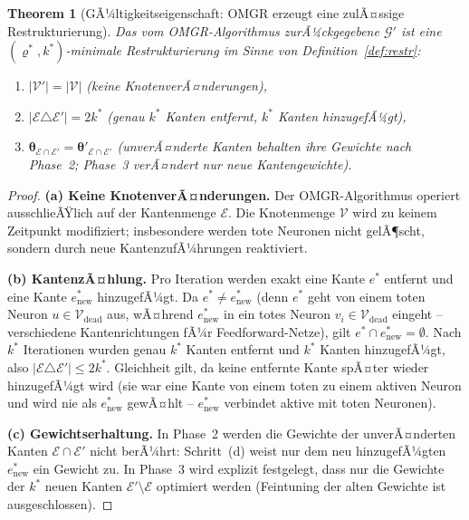 ﻿\documentclass[12pt, a4paper, openany]{report}
\newtheorem{theorem}{Theorem}[chapter]
\newcommand{\calG}{\mathcal{G}}
\newcommand{\calV}{\mathcal{V}}
\newcommand{\calE}{\mathcal{E}}
\begin{document}
\begin{theorem}[GÃ¼ltigkeitseigenschaft: OMGR erzeugt eine zulÃ¤ssige Restrukturierung]
\label{thm:omgr_validity}
Das vom OMGR-Algorithmus zurÃ¼ckgegebene $\calG'$ ist eine
$(\varrho^*, k^*)$-minimale Restrukturierung im Sinne von
Definition~\ref{def:restr}:
\begin{enumerate}[label=(\alph*)]
  \item $|\calV'| = |\calV|$ \quad (keine KnotenverÃ¤nderungen),
  \item $|\calE \triangle \calE'| = 2k^*$ \quad (genau $k^*$ Kanten
        entfernt, $k^*$ Kanten hinzugefÃ¼gt),
  \item $\bm{\theta}_{\calE \cap \calE'} = \bm{\theta}'_{\calE \cap \calE'}$
        \quad (unverÃ¤nderte Kanten behalten ihre Gewichte nach Phase~2;
        Phase~3 verÃ¤ndert nur neue Kantengewichte).
\end{enumerate}
\end{theorem}

\begin{proof}
\textbf{(a) Keine KnotenverÃ¤nderungen.}
Der OMGR-Algorithmus operiert ausschlieÃŸlich auf der Kantenmenge $\calE$.
Die Knotenmenge $\calV$ wird zu keinem Zeitpunkt modifiziert; insbesondere
werden tote Neuronen nicht gelÃ¶scht, sondern durch neue KantenzufÃ¼hrungen
reaktiviert.

\textbf{(b) KantenzÃ¤hlung.}
Pro Iteration werden exakt eine Kante $e^*$ entfernt und eine Kante
$e_{\mathrm{new}}^*$ hinzugefÃ¼gt.  Da $e^* \neq e_{\mathrm{new}}^*$
(denn $e^*$ geht von einem toten Neuron $u \in \calV_{\mathrm{dead}}$ aus,
wÃ¤hrend $e_{\mathrm{new}}^*$ in ein totes Neuron $v_i \in \calV_{\mathrm{dead}}$
eingeht -- verschiedene Kantenrichtungen fÃ¼r Feedforward-Netze), gilt
$e^* \cap e_{\mathrm{new}}^* = \emptyset$.
Nach $k^*$ Iterationen wurden genau $k^*$ Kanten entfernt und $k^*$
Kanten hinzugefÃ¼gt, also $|\calE \triangle \calE'| \leq 2k^*$.
Gleichheit gilt, da keine entfernte Kante spÃ¤ter wieder hinzugefÃ¼gt wird
(sie war eine Kante von einem toten zu einem aktiven Neuron und wird nie
als $e_{\mathrm{new}}^*$ gewÃ¤hlt -- $e_{\mathrm{new}}^*$ verbindet aktive
mit toten Neuronen).

\textbf{(c) Gewichtserhaltung.}
In Phase~2 werden die Gewichte der unverÃ¤nderten Kanten $\calE \cap \calE'$ 
nicht berÃ¼hrt: Schritt~(d) weist nur dem neu hinzugefÃ¼gten $e_{\mathrm{new}}^*$
ein Gewicht zu.  In Phase~3 wird explizit festgelegt, dass nur
die Gewichte der $k^*$ neuen Kanten $\calE' \setminus \calE$ optimiert werden
(Feintuning der alten Gewichte ist ausgeschlossen).
\end{proof}
\end{document}
